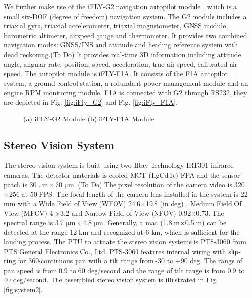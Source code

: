 \documentclass[letterpaper, 10 pt, conference]{ieeeconf}  %
\begin{document}
We further make use of the iFLY-G2 navigation autopilot module \cite{IFLY}, which is a small six-DOF (degree of freedom) navigation system. The G2 module includes a triaxial gyro, triaxial accelerometer, triaxial magnetometer, GNSS module, barometric altimeter, airspeed gauge and thermometer. It provides two combined navigation modes: GNSS/INS and attitude and heading reference system with dead reckoning.(To Do)  It provides real-time 3D information including attitude angle, angular rate, position, speed, acceleration, true air speed, calibrated air speed. The autopilot module is iFLY-F1A. It consists of the F1A autopilot system, a ground control station, a redundant power management module and an engine RPM monitoring module. F1A is connected with G2 through RS232, they are depicted in Fig. \ref{fig:iFly_G2} and Fig. \ref{fig:iFly_F1A}.
   \begin{figure}[!tb]
      \centering
      \caption{(a) iFLY-G2 Module  (b) iFLY-F1A Module}
   \end{figure}
\subsection{Stereo Vision System}
The stereo vision system is built using two IRay Technology IRT301 infrared cameras. The detector materials is cooled MCT (HgCdTe) FPA and the sensor patch is 30 $\mathrm{\mu m}\times$30 $\mathrm{\mu m}$. (To Do) The pixel resolution of the camera video is 320$\times$256 at 50 FPS. The focal length of the camera lens installed in the system is 22 mm with a Wide Field of View (WFOV) 24.6$\times$19.8 (in deg) , Medium Field Of View (MFOV) 4 $\times$3.2 and Narrow Field of View (NFOV) 0.92$\times$0.73. The spectral range is 3.7 $\mathrm{\mu m}\times$4.8 $\mathrm{\mu m}$. Generally, a man (1.8 m$\times$0.5 m) can be detected at the range 12 km and recognized at 6 km, which is sufficient for the landing process.
The PTU to actuate the stereo vision systems is PTS-3060 from PTS General Electronics Co., Ltd. PTS-3060 features internal wiring with slip-ring for 360-continuous pan with a tilt range from -30 to +90 deg. The range of pan speed is from 0.9 to 60 deg/second and the range of tilt range is from 0.9 to 40 deg/second. The assembled stereo vision system is illustrated in Fig. \ref{fig:system2}.
\end{document}
